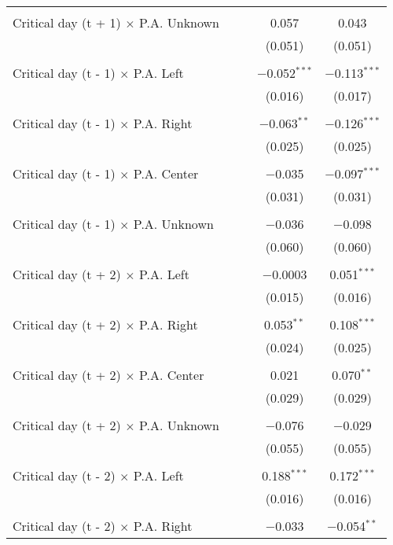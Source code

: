 \documentclass[
]{article}
\begin{document}
\begin{table}[!htbp]
{\begin{tabular}{@{\extracolsep{5pt}}lcccc}
  & & & & \\ 
 Critical day (t + 1) $\times$ P.A. Unknown &  &  & 0.057 & 0.043 \\ 
  &  &  & (0.051) & (0.051) \\ 
  & & & & \\ 
 Critical day (t - 1) $\times$ P.A. Left &  &  & $-$0.052$^{***}$ & $-$0.113$^{***}$ \\ 
  &  &  & (0.016) & (0.017) \\ 
  & & & & \\ 
 Critical day (t - 1) $\times$ P.A. Right &  &  & $-$0.063$^{**}$ & $-$0.126$^{***}$ \\ 
  &  &  & (0.025) & (0.025) \\ 
  & & & & \\ 
 Critical day (t - 1) $\times$ P.A. Center &  &  & $-$0.035 & $-$0.097$^{***}$ \\ 
  &  &  & (0.031) & (0.031) \\ 
  & & & & \\ 
 Critical day (t - 1) $\times$ P.A. Unknown &  &  & $-$0.036 & $-$0.098 \\ 
  &  &  & (0.060) & (0.060) \\ 
  & & & & \\ 
 Critical day (t + 2) $\times$ P.A. Left &  &  & $-$0.0003 & 0.051$^{***}$ \\ 
  &  &  & (0.015) & (0.016) \\ 
  & & & & \\ 
 Critical day (t + 2) $\times$ P.A. Right &  &  & 0.053$^{**}$ & 0.108$^{***}$ \\ 
  &  &  & (0.024) & (0.025) \\ 
  & & & & \\ 
 Critical day (t + 2) $\times$ P.A. Center &  &  & 0.021 & 0.070$^{**}$ \\ 
  &  &  & (0.029) & (0.029) \\ 
  & & & & \\ 
 Critical day (t + 2) $\times$ P.A. Unknown &  &  & $-$0.076 & $-$0.029 \\ 
  &  &  & (0.055) & (0.055) \\ 
  & & & & \\ 
 Critical day (t - 2) $\times$ P.A. Left &  &  & 0.188$^{***}$ & 0.172$^{***}$ \\ 
  &  &  & (0.016) & (0.016) \\ 
  & & & & \\ 
 Critical day (t - 2) $\times$ P.A. Right &  &  & $-$0.033 & $-$0.054$^{**}$ \\ 

\end{tabular}}
\end{table}
\end{document}
